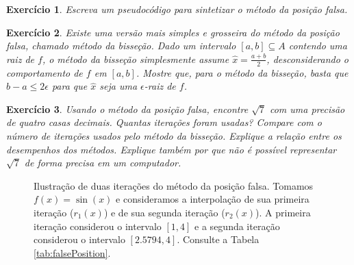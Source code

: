 \documentclass[]{article}
\newtheorem{exercicio}{Exercício}
\numberwithin{equation}{section}
\begin{document}
\begin{exercicio}
  Escreva um pseudocódigo para sintetizar o método da posição falsa.
\end{exercicio}

\begin{exercicio}
  Existe uma versão mais simples e grosseira do método da posição
  falsa, chamado método da bisseção. Dado um intervalo
  $[a, b] \subseteq A$ contendo uma raiz de $f$, o método da bisseção
  simplesmente assume $\hat{x} = \frac{a + b}{2}$, desconsiderando o
  comportamento de $f$ em $[a, b]$. Mostre que, para o método da
  bisseção, basta que $b - a \leq 2\epsilon$ para que $\hat{x}$ seja
  uma $\epsilon$-raiz de $f$.
\end{exercicio}

\begin{exercicio}
  Usando o método da posição falsa, encontre $\sqrt{7}$ com uma
  precisão de quatro casas decimais. Quantas iterações foram usadas?
  Compare com o número de iterações usados pelo método da
  bisseção. Explique a relação entre os desempenhos dos
  métodos. Explique também por que não é possível representar
  $\sqrt{7}$ de forma precisa em um computador.
\end{exercicio}

\begin{figure}[h]
  \centering
  \caption{Ilustração de duas iterações do método da posição falsa.
    Tomamos $f(x) = \sin(x)$ e consideramos a interpolação de sua
    primeira iteração ($r_1(x)$) e de sua segunda iteração ($r_2(x)$).
    A primeira iteração considerou o intervalo $[1, 4]$ e a segunda
    iteração considerou o intervalo $[2.5794, 4]$.  Consulte a Tabela
    \ref{tab:falsePosition}.}
  \label{fig:falsePosition}
\end{figure}
\end{document}

